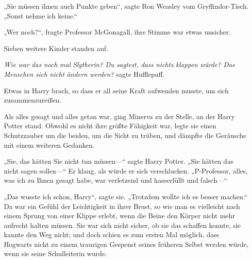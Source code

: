 „Sie müssen ihnen auch Punkte geben“, sagte Ron Weasley vom Gryffindor-Tisch. „Sonst nehme ich keine.“

„Wer noch?“, fragte Professor McGonagall, ihre Stimme war etwas unsicher.

Sieben weitere Kinder standen auf.

\emph{Wie war das noch mal Slytherin? Du sagtest, dass nichts klappen würde? Das Menschen sich nicht ändern werden?} sagte Hufflepuff.

Etwas in Harry brach, so dass er all seine Kraft aufwenden musste, um sich zusammenzureißen.

\later

Als alles gesagt und alles getan war, ging Minerva zu der Stelle, an der Harry Potter stand. Obwohl es nicht ihre größte Fähigkeit war, legte sie einen Schutzzauber um die beiden, um die Sicht zu trüben, und dämpfte die Geräusche mit einem weiteren Gedanken.

„Sie, das hätten Sie nicht tun müssen—“ sagte Harry Potter. „Sie hätten das nicht sagen sollen—“ Er klang, als würde er sich verschlucken. „P-Professor, alles, was ich zu Ihnen gesagt habe, war verletzend und hasserfüllt und falsch—“

„Das wusste ich schon, Harry“, sagte sie. „Trotzdem wollte ich es besser machen.“
Da war ein Gefühl der Leichtigkeit in ihrer Brust, so wie man es vielleicht nach einem Sprung von einer Klippe erlebt, wenn die Beine den Körper nicht mehr aufrecht halten müssen. Sie war sich nicht sicher, ob sie das schaffen konnte, sie kannte den Weg nicht; und doch schien es zum ersten Mal möglich, dass Hogwarts nicht zu einem traurigen Gespenst seines früheren Selbst werden würde, wenn sie seine Schulleiterin wurde.

